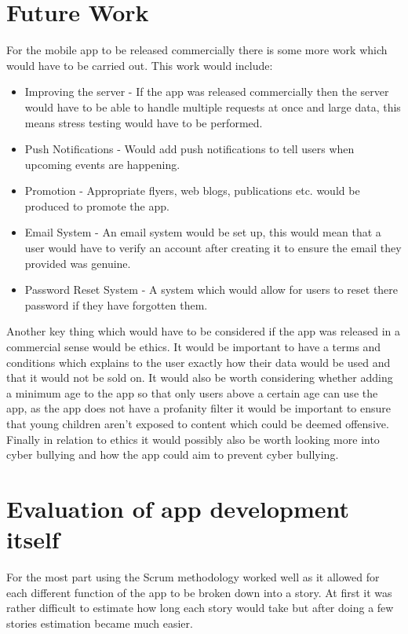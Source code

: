 \section{Future Work}
For the mobile app to be released commercially there is some more work which would have to be carried out. This work would include:
\begin{itemize}
\item Improving the server - If the app was released commercially then the server would have to be able to handle multiple requests at once and large data, this means stress testing would have to be performed.
\item Push Notifications - Would add push notifications to tell users when upcoming events are happening.
\item Promotion - Appropriate flyers, web blogs, publications etc. would be produced to promote the app.
\item Email System - An email system would be set up, this would mean that a user would have to verify an account after creating it to ensure the email they provided was genuine.
\item Password Reset System - A system which would allow for users to reset there password if they have forgotten them.
\end{itemize} 
Another key thing which would have to be considered if the app was released in a commercial sense would be ethics. It would be important to have a terms and conditions which explains to the user exactly how their data would be used and that it would not be sold on. It would also be worth considering whether adding a minimum age to the app so that only users above a certain age can use the app, as the app does not have a profanity filter it would be important to ensure that young children aren't exposed to content which could be deemed offensive. Finally in relation to ethics it would possibly also be worth looking more into cyber bullying and how the app could aim to prevent cyber bullying.

\section{Evaluation of app development itself}
For the most part using the Scrum methodology worked well as it allowed for each different function of the app to be broken down into a story. At first it was rather difficult to estimate how long each story would take but after doing a few stories estimation became much easier.

